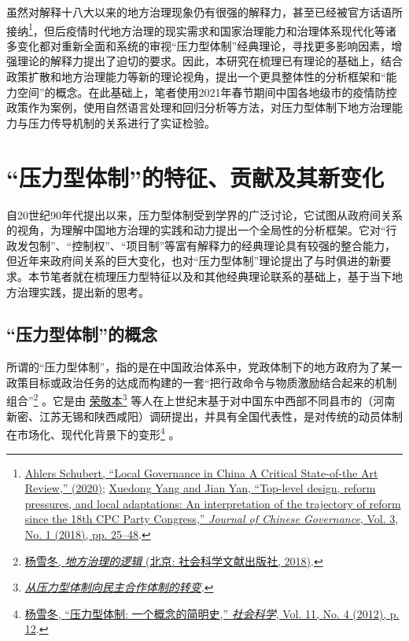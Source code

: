 \documentclass[
  12pt,
]{ctexart}
\begin{document}
虽然对解释十八大以来的地方治理现象仍有很强的解释力，甚至已经被官方话语所接纳\footnote{\protect\hyperlink{ref-Schubert2020}{Ahlers Schubert, {``Local {Governance} in {China} \textendash{} {A Critical State}-of-the {Art Review},''} (2020)}; \protect\hyperlink{ref-YangYan2018}{Xuedong Yang and Jian Yan, {``Top-level design, reform pressures, and local adaptations: An interpretation of the trajectory of reform since the 18th {CPC Party Congress},''} \emph{Journal of Chinese Governance}, Vol. 3, No. 1 (2018), pp. 25--48}.}，但后疫情时代地方治理的现实需求和国家治理能力和治理体系现代化等诸多变化都对重新全面和系统的审视``压力型体制''经典理论，寻找更多影响因素，增强理论的解释力提出了迫切的要求。因此，本研究在梳理已有理论的基础上，结合政策扩散和地方治理能力等新的理论视角，提出一个更具整体性的分析框架和``能力空间''的概念。在此基础上，笔者使用2021年春节期间中国各地级市的疫情防控政策作为案例，使用自然语言处理和回归分析等方法，对压力型体制下地方治理能力与压力传导机制的关系进行了实证检验。

\hypertarget{ux538bux529bux578bux4f53ux5236ux7684ux7279ux5f81ux8d21ux732eux53caux5176ux65b0ux53d8ux5316}{%
\section{``压力型体制''的特征、贡献及其新变化}\label{ux538bux529bux578bux4f53ux5236ux7684ux7279ux5f81ux8d21ux732eux53caux5176ux65b0ux53d8ux5316}}

自20世纪90年代提出以来，压力型体制受到学界的广泛讨论，它试图从政府间关系的视角，为理解中国地方治理的实践和动力提出一个全局性的分析框架。它对``行政发包制''、``控制权''、``项目制''等富有解释力的经典理论具有较强的整合能力，但近年来政府间关系的巨大变化，也对``压力型体制''理论提出了与时俱进的新要求。本节笔者就在梳理压力型特征以及和其他经典理论联系的基础上，基于当下地方治理实践，提出新的思考。

\hypertarget{ux538bux529bux578bux4f53ux5236ux7684ux6982ux5ff5}{%
\subsection{``压力型体制''的概念}\label{ux538bux529bux578bux4f53ux5236ux7684ux6982ux5ff5}}

所谓的``压力型体制''，指的是在中国政治体系中，党政体制下的地方政府为了某一政策目标或政治任务的达成而构建的一套``把行政命令与物质激励结合起来的机制组合''\footnote{\protect\hyperlink{ref-YangXueDong2018}{杨雪冬, \emph{{地方治理的逻辑}} ({北京}: {社会科学文献出版社}, 2018)}.} 。它是由 \protect\hyperlink{ref-RongJingBen1998}{荣敬本}\footnote{\protect\hyperlink{ref-RongJingBen1998}{\emph{从压力型体制向民主合作体制的转变}}.} 等人在上世纪末基于对中国东中西部不同县市的（河南新密、江苏无锡和陕西咸阳）调研提出，并具有全国代表性，是对传统的动员体制在市场化、现代化背景下的变形\footnote{\protect\hyperlink{ref-YangXueDong2012}{杨雪冬, {``压力型体制: 一个概念的简明史,''} \emph{社会科学}, Vol. 11, No. 4 (2012), p. 12}.} 。
\end{document}
